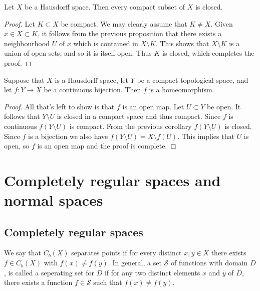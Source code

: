 \documentclass[11pt,a4paper]{article}
\begin{document}
\begin{corollary}
  Let $X$ be a Hausdorff space.
  Then every compact subset of $X$ is closed.
\end{corollary}
\begin{proof}
  Let $K \subset X$ be compact. We may clearly assume that 
  $K \neq X$. Given $x \in X \subset K$, it follows from the previous
  proposition that there exists a neighbourhood $U$ of $x$ which is 
  contained in $X \setminus K$. This shows that $X \setminus K$ is a 
  union of open sets, and so it is itself open. Thus $K$ is 
  closed, which completes the proof. 
\end{proof}

\begin{proposition}
  Suppose that $X$ is a Hausdorff space, let $Y$ be a compact 
  topological space, and let $f \colon Y \to X$ be a continuous 
  bijection. Then $f$ is a homeomorphism.
\end{proposition}
\begin{proof}
  All that's left to show is that $f$ is an open map. Let $U \subset Y$
  be open. It follows that $Y \setminus U$ is closed in a compact space
  and thus compact. Since $f$ is continuous $f(Y \setminus U)$ is
  compact. From the previous corollary $f(Y \setminus U)$ is closed.
  Since $f$ is a bijection we also have 
  $f(Y \setminus U) = X \setminus f(U)$. This implies that $U$ is open,
  so $f$ is an open map and the proof is complete.
\end{proof}

\newpage

\section{Completely regular spaces and normal spaces}

\subsection{Completely regular spaces}

\begin{definition}
  We say that $C_b(X)$ separates points if for every distinct 
  $x, y \in X$ there exists $f \in C_b(X)$ with $f(x) \neq f(y)$.
  In general, a set $\mathcal S$ of functions with domain $D$,
  is called a seperating set for $D$ if for any two distinct elements
  $x$ and $y$ of $D$, there exists a function $f \in \mathcal S$ such
  that $f(x) \neq f(y)$.
\end{definition}
\end{document}
